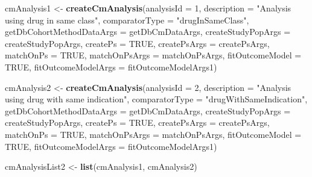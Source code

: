 \documentclass[
]{article}
\newenvironment{Shaded}{\begin{snugshade}}{\end{snugshade}}
\newcommand{\DataTypeTok}[1]{\textcolor[rgb]{0.13,0.29,0.53}{#1}}
\newcommand{\DecValTok}[1]{\textcolor[rgb]{0.00,0.00,0.81}{#1}}
\newcommand{\KeywordTok}[1]{\textcolor[rgb]{0.13,0.29,0.53}{\textbf{#1}}}
\newcommand{\NormalTok}[1]{#1}
\newcommand{\OtherTok}[1]{\textcolor[rgb]{0.56,0.35,0.01}{#1}}
\newcommand{\StringTok}[1]{\textcolor[rgb]{0.31,0.60,0.02}{#1}}
\begin{document}
\begin{Shaded}
\begin{Highlighting}[]
\NormalTok{cmAnalysis1 <-}\StringTok{ }\KeywordTok{createCmAnalysis}\NormalTok{(}\DataTypeTok{analysisId =} \DecValTok{1}\NormalTok{,}
                                \DataTypeTok{description =} \StringTok{"Analysis using drug in same class"}\NormalTok{,}
                                \DataTypeTok{comparatorType =} \StringTok{"drugInSameClass"}\NormalTok{,}
                                \DataTypeTok{getDbCohortMethodDataArgs =}\NormalTok{ getDbCmDataArgs,}
                                \DataTypeTok{createStudyPopArgs =}\NormalTok{ createStudyPopArgs,}
                                \DataTypeTok{createPs =} \OtherTok{TRUE}\NormalTok{,}
                                \DataTypeTok{createPsArgs =}\NormalTok{ createPsArgs,}
                                \DataTypeTok{matchOnPs =} \OtherTok{TRUE}\NormalTok{,}
                                \DataTypeTok{matchOnPsArgs =}\NormalTok{ matchOnPsArgs,}
                                \DataTypeTok{fitOutcomeModel =} \OtherTok{TRUE}\NormalTok{,}
                                \DataTypeTok{fitOutcomeModelArgs =}\NormalTok{ fitOutcomeModelArgs1)}

\NormalTok{cmAnalysis2 <-}\StringTok{ }\KeywordTok{createCmAnalysis}\NormalTok{(}\DataTypeTok{analysisId =} \DecValTok{2}\NormalTok{,}
                                \DataTypeTok{description =} \StringTok{"Analysis using drug with same indication"}\NormalTok{,}
                                \DataTypeTok{comparatorType =} \StringTok{"drugWithSameIndication"}\NormalTok{,}
                                \DataTypeTok{getDbCohortMethodDataArgs =}\NormalTok{ getDbCmDataArgs,}
                                \DataTypeTok{createStudyPopArgs =}\NormalTok{ createStudyPopArgs,}
                                \DataTypeTok{createPs =} \OtherTok{TRUE}\NormalTok{,}
                                \DataTypeTok{createPsArgs =}\NormalTok{ createPsArgs,}
                                \DataTypeTok{matchOnPs =} \OtherTok{TRUE}\NormalTok{,}
                                \DataTypeTok{matchOnPsArgs =}\NormalTok{ matchOnPsArgs,}
                                \DataTypeTok{fitOutcomeModel =} \OtherTok{TRUE}\NormalTok{,}
                                \DataTypeTok{fitOutcomeModelArgs =}\NormalTok{ fitOutcomeModelArgs1)}

\NormalTok{cmAnalysisList2 <-}\StringTok{ }\KeywordTok{list}\NormalTok{(cmAnalysis1, cmAnalysis2)}
\end{Highlighting}
\end{Shaded}
\end{document}
